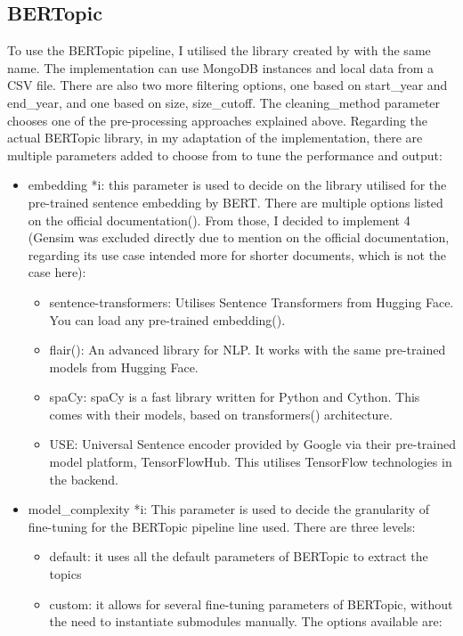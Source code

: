 \documentclass[12pt,MSc,a4paper,oneside]{muthesis}
\begin{document}
\subsection{BERTopic}
To use the BERTopic pipeline, I utilised the library created by \cite{grootendorst2020bertopic} with the same name.
The implementation can use MongoDB instances and local data from a CSV file. There are also two more filtering options, one based on start\_year and end\_year, and one based on size, size\_cutoff. The cleaning\_method parameter chooses one of the pre-processing approaches explained above.
Regarding the actual BERTopic library, in my adaptation of the implementation, there are multiple parameters added to choose from to tune the performance and output:
\begin{itemize}
  \item embedding *i: this parameter is used to decide on the library utilised for the pre-trained sentence embedding by BERT. There are multiple options listed on the official documentation(\cite{bertopic-embeddings}). From those, I decided to implement 4 (Gensim was excluded directly due to mention on the official documentation, regarding its use case intended more for shorter documents, which is not the case here):
    \begin{itemize}
      \item sentence-transformers: Utilises Sentence Transformers from Hugging Face. You can load any pre-trained embedding(\cite{huggingface-models}).
      \item  flair(\cite{flair-nlp}): An advanced library for NLP. It works with the same pre-trained models from Hugging Face.
      \item spaCy: spaCy is a fast library written for Python and Cython. This comes with their models, based on transformers(\cite{DBLP:journals/corr/VaswaniSPUJGKP17}) architecture.
      \item USE: Universal Sentence encoder provided by Google via their pre-trained model platform, TensorFlowHub. This utilises TensorFlow technologies in the backend.
    \end{itemize}
  \item model\_complexity *i: This parameter is used to decide the granularity of fine-tuning for the BERTopic pipeline line used. There are three levels:
    \begin{itemize}
      \item default: it uses all the default parameters of BERTopic to extract the topics
      \item  custom: it allows for several fine-tuning parameters of BERTopic, without the need to instantiate submodules manually. The options available are:

\end{itemize}
\end{itemize}
\end{document}
